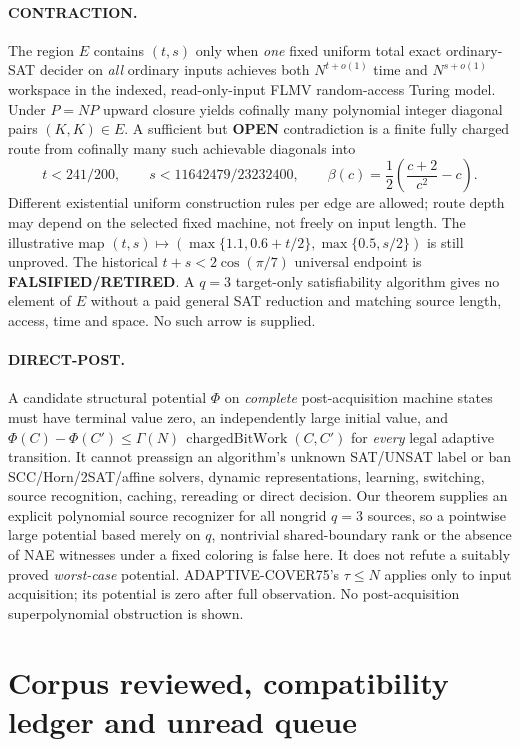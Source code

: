 \documentclass[11pt]{article}
\begin{document}
\paragraph{CONTRACTION.}
The region $E$ contains $(t,s)$ only when \emph{one} fixed uniform
total exact ordinary-SAT decider on \emph{all} ordinary inputs
achieves both $N^{t+o(1)}$ time and $N^{s+o(1)}$ workspace in
the indexed, read-only-input FLMV random-access Turing model.
Under $P=NP$ upward closure yields cofinally many polynomial
integer diagonal pairs $(K,K)\in E$. A sufficient but
\textbf{OPEN} contradiction is a finite fully charged
route from cofinally many such achievable diagonals into
\[
\boxed{t<241/200,\qquad s<11642479/23232400},
\qquad
\beta(c)=\frac12\left(\frac{c+2}{c^2}-c\right).
\]
Different existential uniform construction rules per edge are
allowed; route depth may depend on the selected fixed machine,
not freely on input length. The illustrative map
$(t,s)\mapsto(\max\{1.1,0.6+t/2\},\max\{0.5,s/2\})$
is still unproved. The historical $t+s<2\cos(\pi/7)$
universal endpoint is \textbf{FALSIFIED/RETIRED}.
A $q=3$ target-only satisfiability algorithm gives no element
of $E$ without a paid general SAT reduction and matching source
length, access, time and space. No such arrow is supplied.

\paragraph{DIRECT-POST.}
A candidate structural potential $\Phi$ on \emph{complete}
post-acquisition machine states must have terminal value zero,
an independently large initial value, and
$\Phi(C)-\Phi(C')\le\Gamma(N)\,
\operatorname{chargedBitWork}(C,C')$
for \emph{every} legal adaptive transition. It cannot
preassign an algorithm's unknown SAT/UNSAT label or ban
SCC/Horn/2SAT/affine solvers, dynamic representations,
learning, switching, source recognition, caching, rereading
or direct decision. Our theorem supplies an explicit
polynomial source recognizer for all nongrid $q=3$ sources,
so a pointwise large potential based merely on $q$,
nontrivial shared-boundary rank or the absence of NAE
witnesses under a fixed coloring is false here.
It does not refute a suitably proved \emph{worst-case}
potential. ADAPTIVE-COVER75's $\tau\le N$ applies
only to input acquisition; its potential is zero after full
observation. No post-acquisition superpolynomial
obstruction is shown.

\section{Corpus reviewed, compatibility ledger and unread queue}
\end{document}
